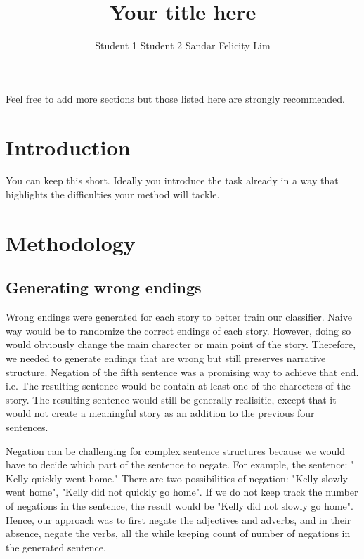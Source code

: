 \documentclass{article}
\title{Your title here}
\author{Student 1 \qquad Student 2 \qquad Sandar Felicity Lim}
\begin{document}

\maketitle


Feel free to add more sections but those listed here are strongly recommended.
\section{Introduction}
You can keep this short. Ideally you introduce the task already in a way that highlights the difficulties  your method will tackle.

\section{Methodology}
\subsection{Generating wrong endings}
Wrong endings were generated for each story to better train our classifier. Naive way would be to randomize the correct endings of each story. However, doing so would obviously change the main charecter or main point of the story. Therefore, we needed to generate endings that are wrong but still preserves narrative structure. Negation of the fifth sentence was a promising way to achieve that end. i.e. The resulting sentence would be contain at least one of the charecters of the story. The resulting sentence would still be generally realisitic, except that it would not create a meaningful story as an addition to the previous four sentences.

Negation can be challenging for complex sentence structures because we would have to decide which part of the sentence to negate. For example, the sentence: "
Kelly quickly went home." There are two possibilities of negation: "Kelly slowly went home", "Kelly did not quickly go home". If we do not keep track the number of negations in the sentence, the result would be "Kelly did not slowly go home". Hence, our approach was to first negate the adjectives and adverbs, and in their absence, negate the verbs, all the while keeping count of number of negations in the generated sentence.
\end{document}
